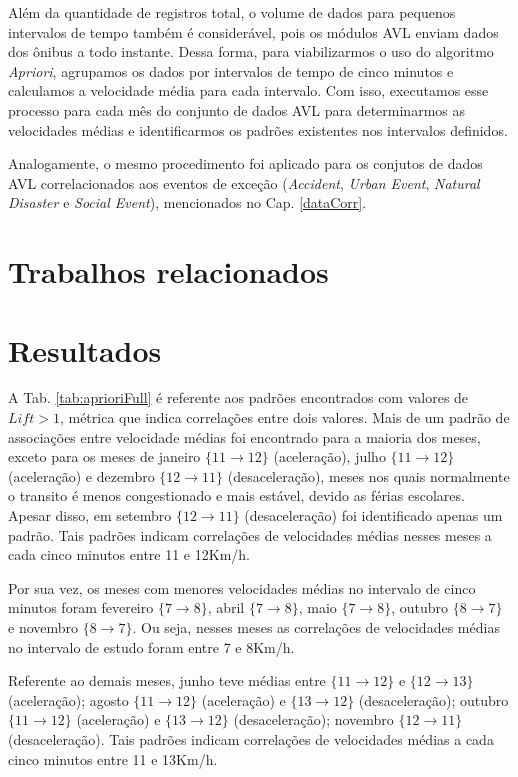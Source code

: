 \documentclass[
	12pt,				%
	oneside,			%
	a4paper,			%
	english,			%
	brazil				%
	]{abntex2ppgsi}
\begin{document}
Além da quantidade de registros total, o volume de dados para pequenos intervalos de tempo também é considerável, pois os módulos AVL enviam dados dos ônibus a todo instante. Dessa forma, para viabilizarmos o uso do algoritmo \textit{Apriori}, agrupamos os dados por intervalos de tempo de cinco minutos e calculamos a velocidade média para cada intervalo. Com isso, executamos esse processo para cada mês do conjunto de dados AVL para determinarmos as velocidades médias e identificarmos os padrões existentes nos intervalos definidos.

Analogamente, o mesmo procedimento foi aplicado para os conjutos de dados AVL correlacionados aos eventos de exceção (\textit{Accident}, \textit{Urban Event}, \textit{Natural Disaster} e \textit{Social Event}), mencionados no Cap. \ref{dataCorr}.

\section{Trabalhos relacionados}

\section{Resultados}

A Tab. \ref{tab:aprioriFull} é referente aos padrões encontrados com valores de $\textit{Lift} > 1$, métrica que indica correlações entre dois valores. Mais de um padrão de associações entre velocidade médias foi encontrado para a maioria dos meses, exceto para os meses de janeiro $\lbrace 11 \rightarrow 12 \rbrace$ (aceleração), julho $\lbrace 11 \rightarrow 12\rbrace$ (aceleração) e dezembro $\lbrace12 \rightarrow 11\rbrace$ (desaceleração), meses nos quais normalmente o transito é menos congestionado e mais estável, devido as férias escolares. Apesar disso, em setembro $\lbrace12 \rightarrow 11\rbrace$ (desaceleração) foi identificado apenas um padrão. Tais padrões indicam correlações de velocidades médias nesses meses a cada cinco minutos entre 11 e 12Km/h.

Por sua vez, os meses com menores velocidades médias no intervalo de cinco minutos foram fevereiro $\lbrace 7 \rightarrow 8\rbrace$, abril $\lbrace 7 \rightarrow 8 \rbrace$, maio $\lbrace7 \rightarrow 8\rbrace$, outubro $\lbrace8 \rightarrow 7\rbrace$ e novembro $\lbrace8 \rightarrow 7\rbrace$. Ou seja, nesses meses as correlações de velocidades médias no intervalo de estudo foram entre 7 e 8Km/h.

Referente ao demais meses, junho teve médias entre $\lbrace11 \rightarrow 12\rbrace$ e $\lbrace12 \rightarrow 13\rbrace$ (aceleração); agosto $\lbrace11 \rightarrow 12\rbrace$ (aceleração) e $\lbrace13 \rightarrow 12\rbrace$  (desaceleração); outubro $\lbrace11 \rightarrow 12\rbrace$ (aceleração) e $\lbrace13 \rightarrow 12\rbrace$ (desaceleração); novembro $\lbrace12 \rightarrow 11\rbrace$ (desaceleração). Tais padrões indicam correlações de velocidades médias a cada cinco minutos entre 11 e 13Km/h.
\end{document}
